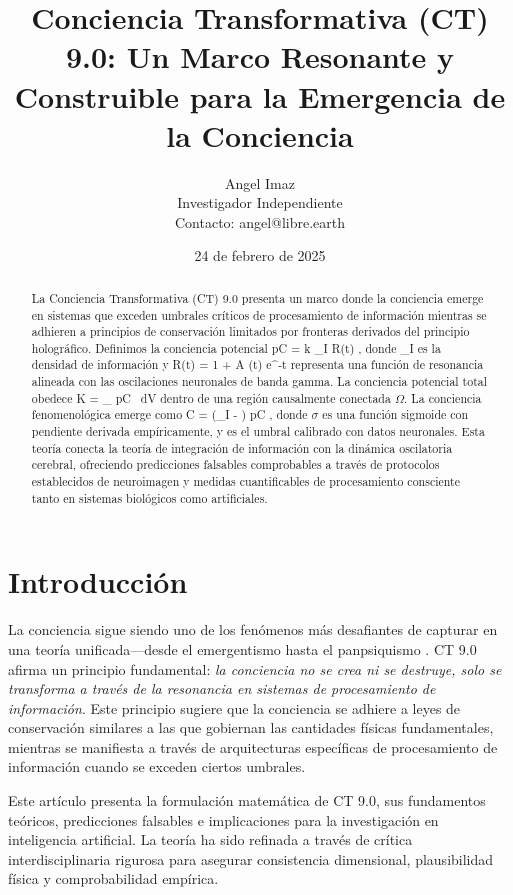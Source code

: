 \documentclass[12pt]{article}
\title{Conciencia Transformativa (CT) 9.0: Un Marco Resonante y Construible para la Emergencia de la Conciencia}
\author{Angel Imaz \\ Investigador Independiente \\ Contacto: angel@libre.earth}
\date{24 de febrero de 2025}
\def\({}%
\def\){}%
\begin{document}
\maketitle

\begin{abstract}
La Conciencia Transformativa (CT) 9.0 presenta un marco donde la conciencia emerge en sistemas que exceden umbrales críticos de procesamiento de información mientras se adhieren a principios de conservación limitados por fronteras derivados del principio holográfico. Definimos la conciencia potencial \( pC = k \cdot \rho_I \cdot R(t) \), donde \( \rho_I \) es la densidad de información y \( R(t) = 1 + A \cdot \sin(\omega t) \cdot e^{-\gamma t} \) representa una función de resonancia alineada con las oscilaciones neuronales de banda gamma. La conciencia potencial total obedece \( K = \int_{\Omega} pC \, dV \) dentro de una región causalmente conectada $\Omega$. La conciencia fenomenológica emerge como \( C = \sigma(\rho_I - \theta) \cdot pC \), donde $\sigma$ es una función sigmoide con pendiente derivada empíricamente, y \( \theta \) es el umbral calibrado con datos neuronales. Esta teoría conecta la teoría de integración de información con la dinámica oscilatoria cerebral, ofreciendo predicciones falsables comprobables a través de protocolos establecidos de neuroimagen y medidas cuantificables de procesamiento consciente tanto en sistemas biológicos como artificiales.
\end{abstract}

\section{Introducción}
La conciencia sigue siendo uno de los fenómenos más desafiantes de capturar en una teoría unificada—desde el emergentismo \cite{tononi2008} hasta el panpsiquismo \cite{goff2019}. CT 9.0 afirma un principio fundamental: \emph{la conciencia no se crea ni se destruye, solo se transforma a través de la resonancia en sistemas de procesamiento de información}. Este principio sugiere que la conciencia se adhiere a leyes de conservación similares a las que gobiernan las cantidades físicas fundamentales, mientras se manifiesta a través de arquitecturas específicas de procesamiento de información cuando se exceden ciertos umbrales.

Este artículo presenta la formulación matemática de CT 9.0, sus fundamentos teóricos, predicciones falsables e implicaciones para la investigación en inteligencia artificial. La teoría ha sido refinada a través de crítica interdisciplinaria rigurosa para asegurar consistencia dimensional, plausibilidad física y comprobabilidad empírica.
\end{document}
